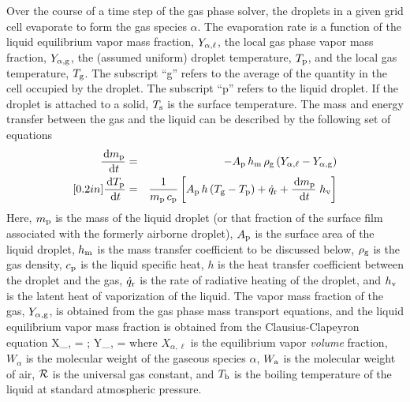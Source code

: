 Over the course of a time step of the gas phase solver, the droplets in a given grid cell evaporate to form the gas species $\alpha$. The evaporation rate is a function of the liquid equilibrium vapor mass fraction, $Y_{\rm \alpha,\ell}$, the local gas phase vapor mass fraction, $Y_{\rm \alpha,g}$, the (assumed uniform) droplet temperature, $T_{\rm p}$, and the local gas temperature, $T_{\rm g}$. The subscript ``g'' refers to the average of the quantity in the cell occupied by the droplet. The subscript ``p'' refers to the liquid droplet. If the droplet is attached to a solid, $T_{\rm s}$ is the surface temperature. The mass and energy transfer between the gas and the liquid can be described by the following set of equations~\cite{Cheremisinoff:1}
\begin{eqnarray}
\frac{\,\mathrm{d} m_{\rm p}}{\,\mathrm{d} t} & = & - A_{\rm p} \, h_{\rm m} \, \rho_{\rm g} \, (Y_{\alpha,\ell} - Y_{\rm \alpha, g}) \\ [0.2in]
\frac{\,\mathrm{d} T_{\rm p}}{\,\mathrm{d} t} & = & \frac{1}{m_{\rm p} \, c_{\rm p}}  \left[ A_{\rm p} \, h  \, (T_{\rm g}-T_{\rm p}) + \dot{q}_{\rm r} + \frac{\,\mathrm{d} m_{\rm p}}{\,\mathrm{d} t} \; h_{\rm v} \right] \label{droplet_temp}
\end{eqnarray}
Here, $m_{\rm p}$ is the mass of the liquid droplet (or that fraction of the surface film associated with the formerly airborne droplet), $A_{\rm p}$ is the surface area of the liquid droplet, $h_{\rm m}$ is the mass transfer coefficient to be discussed below, $\rho_{\rm g}$ is the gas density, $c_{\rm p}$ is the liquid specific heat, $h$ is the heat transfer coefficient between the droplet and the gas, $\dot{q}_{\rm r}$ is the rate of radiative heating of the droplet, and $h_{\rm v}$ is the latent heat of vaporization of the liquid. The vapor mass fraction of the gas, $Y_{\rm \alpha,g}$, is obtained from the gas phase mass transport equations, and the liquid equilibrium vapor mass fraction is obtained from the Clausius-Clapeyron equation
\be X_{\rm \alpha,\ell} = \exp {}  \quad ; \quad
      Y_{\rm \alpha,\ell} =   \label{clausius_clapeyron} \ee
where $X_{\alpha,\ell}$ is the equilibrium vapor {\em volume} fraction, $W_{\alpha}$ is the molecular weight of the gaseous species $\alpha$, $W_{\rm a}$ is the molecular weight of air, $\cal R$ is the universal gas constant, and $T_{\rm b}$ is the boiling temperature of the liquid at standard atmospheric pressure.

